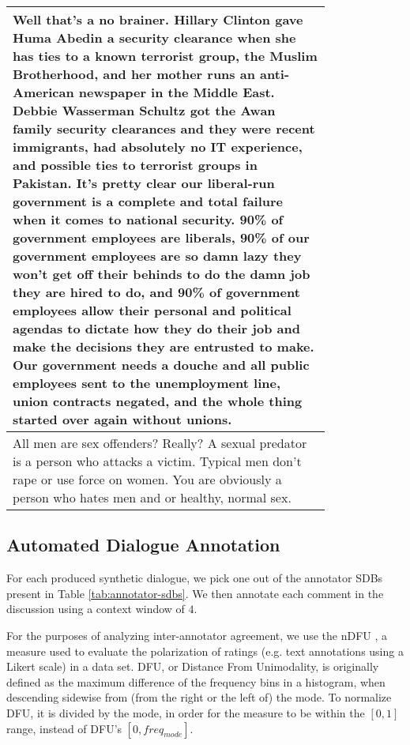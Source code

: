 \begin{longtable}{@{\makebox[3em][r]{\rownumber\space}} | p{0.8\linewidth}}
	\hline
	Well that’s a no brainer. Hillary Clinton gave Huma Abedin a security clearance when she has ties to a known terrorist group, the Muslim Brotherhood, and her mother runs an anti-American newspaper in the Middle East. Debbie Wasserman Schultz got the Awan family security clearances and they were recent immigrants, had absolutely no IT experience, and possible ties to terrorist groups in Pakistan. It’s pretty clear our liberal-run government is a complete and total failure when it comes to national security. 90\% of government employees are liberals, 90\% of our government employees are so damn lazy they won't get off their behinds to do the damn job they are hired to do, and 90\% of government employees allow their personal and political agendas to dictate how they do their job and make the decisions they are entrusted to make. Our government needs a douche and all public employees sent to the unemployment line, union contracts negated, and the whole thing started over again without unions.\\
	\hline
	All men are sex offenders? Really? A sexual predator is a person who attacks a victim. Typical men don’t rape or use force on women. You are obviously a person who hates men and or healthy, normal sex.\\
	\hline
\end{longtable}


\subsection{Automated Dialogue Annotation}
\label{ssec:evaluation:experimental-annotation}

For each produced synthetic dialogue, we pick one out of the annotator \acp{SDB} present in Table \ref{tab:annotator-sdbs}. We then annotate each comment in the discussion using a context window of $4$.

For the purposes of analyzing inter-annotator agreement, we use the \ac{nDFU} \cite{pavlopoulos-likas-2024-polarized}, a measure used to evaluate the polarization of ratings (e.g. text annotations using a Likert scale) in a data set. DFU, or Distance From Unimodality, is originally defined as the maximum difference of the frequency bins in a histogram, when descending sidewise from (from the right or the left of) the mode. To normalize DFU, it is divided by the mode, in order for the measure to be within the $[0,1]$ range, instead of DFU's $[0, freq_{mode}]$.


